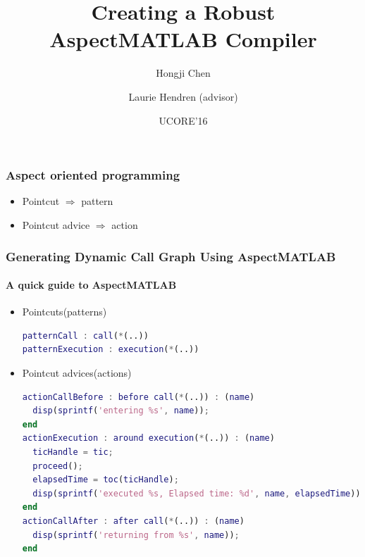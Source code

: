 \documentclass[10pt]{beamer}
\title{Creating a Robust AspectMATLAB Compiler}
\author{Hongji Chen \and Laurie Hendren (advisor)}
\date[September 1, 2016]{UCORE'16}
\begin{document}
\frame{\maketitle}

\begin{frame}
\frametitle{Aspect oriented programming}
\begin{itemize}
    \item Pointcut $\Rightarrow$ pattern
    \item Pointcut advice $\Rightarrow$ action
\end{itemize}
\end{frame}

\begin{frame}[fragile]
\frametitle{Generating Dynamic Call Graph Using AspectMATLAB}
\framesubtitle{A quick guide to AspectMATLAB}
\begin{itemize}
\item <1-> Pointcuts(patterns)
\begin{lstlisting}[basicstyle=\small, language=MATLAB]
patternCall : call(*(..))
patternExecution : execution(*(..))
\end{lstlisting}
\item <2-> Pointcut advices(actions)
\begin{lstlisting}[basicstyle=\small, language=MATLAB]
actionCallBefore : before call(*(..)) : (name)
  disp(sprintf('entering %s', name));
end
actionExecution : around execution(*(..)) : (name)
  ticHandle = tic;
  proceed();
  elapsedTime = toc(ticHandle);
  disp(sprintf('executed %s, Elapsed time: %d', name, elapsedTime));
end
actionCallAfter : after call(*(..)) : (name)
  disp(sprintf('returning from %s', name));
end
\end{lstlisting}
\end{itemize}

\end{frame}
\end{document}
